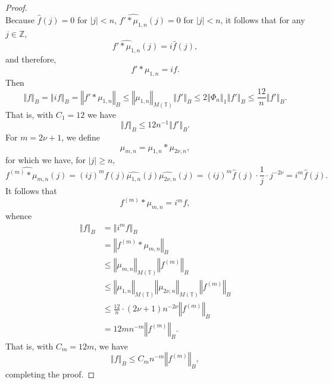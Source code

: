\documentclass{article}
\newcommand{\norm}[1]{\left\Vert #1 \right\Vert}
\theoremstyle{definition}
\theoremstyle{definition}
\begin{document}
\begin{proof}
\[\]
Because $\hat{f}(j)=0$ for $|j|<n$, 
$\widehat{f'*\mu_{1,n}}(j) =0$ for $|j|<n$, it follows that for any $j \in \mathbb{Z}$,
\[
\widehat{f'*\mu_{1,n}}(j) = i \hat{f}(j),
\]
and therefore,
\[
f'*\mu_{1,n} = if.
\]
Then
\[
\norm{f}_B = \norm{if}_B = \norm{f'*\mu_{1,n}}_B \leq 
\norm{\mu_{1,n}}_{M(\mathbb{T})} \norm{f'}_B
\leq 2 \norm{\Phi_n}_1 \norm{f'}_B
\leq \frac{12}{n} \norm{f'}_B.
\]
That is, with $C_1=12$ we have
\[
\norm{f}_B \leq 12 n^{-1} \norm{f'}_B.
\]
For $m=2\nu+1$, we define 
\[
\mu_{m,n} = \mu_{1,n}*\mu_{2\nu,n},
\]
for which we have, for $|j| \geq n$,
\[
\widehat{f^{(m)} *\mu_{m,n}}(j) = 
(ij)^m \hat{f}(j) \widehat{\mu_{1,n}}(j) \widehat{\mu_{2\nu,n}}(j)
=(ij)^m \hat{f}(j) \cdot \frac{1}{j} \cdot j^{-2\nu}
=i^m \hat{f}(j).
\]
It follows that 
\[
f^{(m)}*\mu_{m,n} = i^m f,
\]
whence
\begin{align*}
\norm{f}_B &= \norm{i^m f}_B \\
&= \norm{f^{(m)}*\mu_{m,n}}_B\\
&\leq \norm{\mu_{m,n}}_{M(\mathbb{T})} \norm{f^{(m)}}_B\\
&\leq \norm{\mu_{1,n}}_{M(\mathbb{T})}
\norm{\mu_{2\nu,n}}_{M(\mathbb{T})} 
\norm{f^{(m)}}_B\\
&\leq \frac{12}{n} \cdot (2\nu+1)n^{-2\nu} \norm{f^{(m)}}_B\\
&=12mn^{-m}  \norm{f^{(m)}}_B.
\end{align*}
That is, with $C_m=12m$, we have
\[
\norm{f}_B \leq C_m n^{-m} \norm{f^{(m)}}_B,
\]
completing the proof.
\end{proof}
\end{document}
